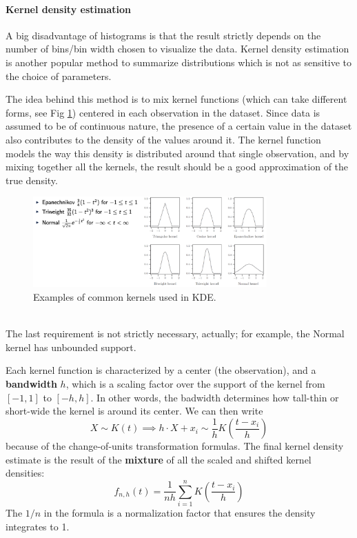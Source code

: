 \paragraph{Kernel density estimation}
A big disadvantage of histograms is that the result strictly depends on the number of bins/bin width chosen to visualize the data. Kernel density estimation is another popular method to summarize distributions which is not as sensitive to the choice of parameters.

The idea behind this method is to mix kernel functions (which can take different forms, see Fig \ref{fig:kernels}) centered in each observation in the dataset. Since data is assumed to be of continuous nature, the presence of a certain value in the dataset also contributes to the density of the values around it. The kernel function models the way this density is distributed around that single observation, and by mixing together all the kernels, the result should be a good approximation of the true density.
\begin{figure}[h]
    \centering
    \includegraphics[width=0.8\textwidth]{img/kernels.png}
    \caption{Examples of common kernels used in KDE.}
    \label{fig:kernels}
\end{figure} \\
The last requirement is not strictly necessary, actually; for example, the Normal kernel has unbounded support.

Each kernel function is characterized by a center (the observation), and a \textbf{bandwidth} $h$, which is a scaling factor over the support of the kernel from $[-1, 1]$ to $[-h, h]$. In other words, the badwidth determines how tall-thin or short-wide the kernel is around its center. We can then write
\[
    X \sim K(t) \implies h \cdot X + x_i \sim \frac{1}{h} K \left ( \frac{t - x_i}{h} \right )
\]
because of the change-of-units transformation formulas. The final kernel density estimate is the result of the \textbf{mixture} of all the scaled and shifted kernel densities:
\begin{equation*}
    f_{n,h} (t) = \frac{1}{nh} \sum_{i=1}^n K\left ( \frac{t-x_i}{h}\right )
\end{equation*}
The $1/n$ in the formula is a normalization factor that ensures the density integrates to 1.

